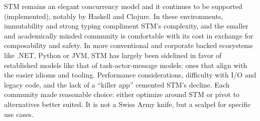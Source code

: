 STM remains an elegant concurrency model and it
continues to be supported (implemented), notably by Haskell and Clojure.
In these environments, immutability and strong typing compliment STM’s complexity,
and the smaller and academically minded community is comfortable with its cost
in exchange for composability and safety. In more conventional and corporate
backed ecosystems like .NET, Python or JVM, STM has largely been sidelined
in favor of established models like that of task-actor-message models;
ones that align with the easier idioms and tooling.
Performance considerations, difficulty with I/O and legacy code,
and the lack of a “killer app” cemented STM’s decline.
Each community made reasonable choice: either optimize
around STM or pivot to alternatives better suited.
It is not a Swiss Army knife, but a scalpel for specific use cases.